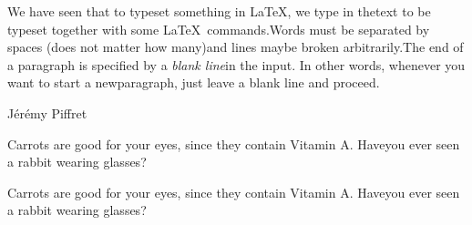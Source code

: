 \documentclass{article}
\begin{document}
We have seen that to typeset something in \LaTeX, we type in thetext to be
typeset together with some \LaTeX\ commands.Words must be separated by spaces
(does not matter how many)and lines maybe broken arbitrarily.The end of a
paragraph is specified by a \emph{blank line}in the input. In other words,
whenever you want to start a newparagraph, just leave a blank line and proceed.

Jérémy Piffret


Carrots are good for your eyes, since they contain Vitamin A\@. Haveyou ever
seen a rabbit wearing glasses?

Carrots are good for your eyes, since they contain Vitamin A. Haveyou ever
seen a rabbit wearing glasses?
\end{document}
